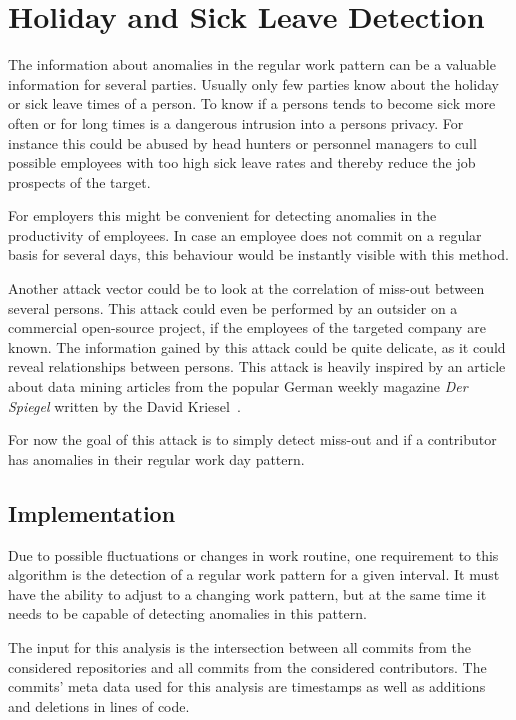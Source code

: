 \section{Holiday and Sick Leave Detection}

The information about anomalies in the regular work pattern can be a valuable information for several parties.
Usually only few parties know about the holiday or sick leave times of a person.
To know if a persons tends to become sick more often or for long times is a dangerous intrusion into a persons privacy.
For instance this could be abused by head hunters or personnel managers to cull possible employees with too high sick leave rates and thereby reduce the job prospects of the target.

For employers this might be convenient for detecting anomalies in the productivity of employees.
In case an employee does not commit on a regular basis for several days, this behaviour would be instantly visible with this method.

Another attack vector could be to look at the correlation of miss-out between several persons.
This attack could even be performed by an outsider on a commercial open-source project, if the employees of the targeted company are known.
The information gained by this attack could be quite delicate, as it could reveal relationships between persons.
This attack is heavily inspired by an article about data mining articles from the popular German weekly magazine \emph{Der Spiegel} written by the David Kriesel~\cite{article:spiegel-mining}.

For now the goal of this attack is to simply detect miss-out and if a contributor has anomalies in their regular work day pattern.


\subsection{Implementation}

Due to possible fluctuations or changes in work routine, one requirement to this algorithm is the detection of a regular work pattern for a given interval.
It must have the ability to adjust to a changing work pattern, but at the same time it needs to be capable of detecting anomalies in this pattern.

The input for this analysis is the intersection between all commits from the considered repositories and all commits from the considered contributors.
The commits' meta data used for this analysis are timestamps as well as additions and deletions in lines of code.

